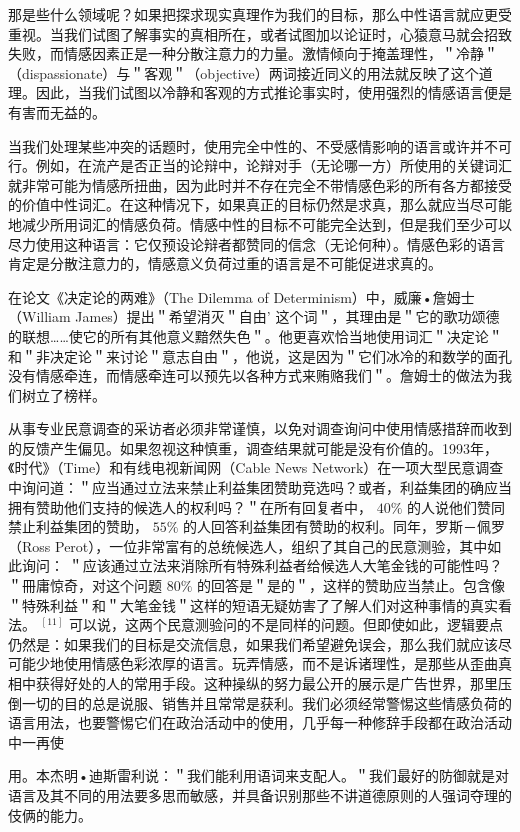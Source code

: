 那是些什么领域呢？如果把探求现实真理作为我们的目标，那么中性语言就应更受重视。当我们试图了解事实的真相所在，或者试图加以论证时，心猿意马就会招致失败，而情感因素正是一种分散注意力的力量。激情倾向于掩盖理性，＂冷静＂（dispassionate）与＂客观＂（objective）两词接近同义的用法就反映了这个道理。因此，当我们试图以冷静和客观的方式推论事实时，使用强烈的情感语言便是有害而无益的。

当我们处理某些冲突的话题时，使用完全中性的、不受感情影响的语言或许并不可行。例如，在流产是否正当的论辩中，论辩对手（无论哪一方）所使用的关键词汇就非常可能为情感所扭曲，因为此时并不存在完全不带情感色彩的所有各方都接受的价值中性词汇。在这种情况下，如果真正的目标仍然是求真，那么就应当尽可能地减少所用词汇的情感负荷。情感中性的目标不可能完全达到，但是我们至少可以尽力使用这种语言：它仅预设论辩者都赞同的信念（无论何种）。情感色彩的语言肯定是分散注意力的，情感意义负荷过重的语言是不可能促进求真的。

在论文《决定论的两难》（The Dilemma of Determinism）中，威廉•詹姆士（William James）提出＂希望消灭＂自由’ 这个词＂，其理由是＂它的歌功颂德的联想……使它的所有其他意义黯然失色＂。他更喜欢恰当地使用词汇＂决定论＂和＂非决定论＂来讨论＂意志自由＂，他说，这是因为＂它们冰冷的和数学的面孔没有情感牵连，而情感牵连可以预先以各种方式来贿赂我们＂。詹姆士的做法为我们树立了榜样。

从事专业民意调查的采访者必须非常谨慎，以免对调查询问中使用情感措辞而收到的反馈产生偏见。如果忽视这种慎重，调查结果就可能是没有价值的。1993年，《时代》（Time）和有线电视新闻网（Cable News Network）在一项大型民意调查中询问道：＂应当通过立法来禁止利益集团赞助竞选吗？或者，利益集团的确应当拥有赞助他们支持的候选人的权利吗？＂在所有回复者中， $40 \%$ 的人说他们赞同禁止利益集团的赞助， $55 \%$ 的人回答利益集团有赞助的权利。同年，罗斯－佩罗（Ross Perot），一位非常富有的总统候选人，组织了其自己的民意测验，其中如此询问： ＂应该通过立法来消除所有特殊利益者给候选人大笔金钱的可能性吗？＂冊庸惊奇，对这个问题 $80 \%$ 的回答是＂是的＂，这样的赞助应当禁止。包含像＂特殊利益＂和＂大笔金钱＂这样的短语无疑妨害了了解人们对这种事情的真实看法。 ${ }^{[11]}$ 可以说，这两个民意测验问的不是同样的问题。但即使如此，逻辑要点仍然是：如果我们的目标是交流信息，如果我们希望避免误会，那么我们就应该尽可能少地使用情感色彩浓厚的语言。玩弄情感，而不是诉诸理性，是那些从歪曲真相中获得好处的人的常用手段。这种操纵的努力最公开的展示是广告世界，那里压倒一切的目的总是说服、销售并且常常是获利。我们必须经常警惕这些情感负荷的语言用法，也要警惕它们在政治活动中的使用，几乎每一种修辞手段都在政治活动中一再使

用。本杰明•迪斯雷利说：＂我们能利用语词来支配人。＂我们最好的防御就是对语言及其不同的用法要多思而敏感，并具备识别那些不讲道德原则的人强词夺理的伎俩的能力。

